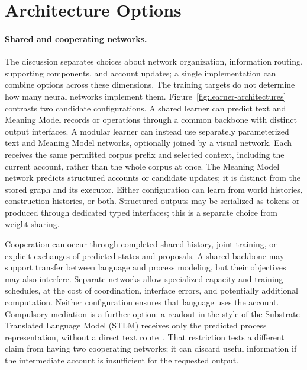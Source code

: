 \documentclass[10pt]{article}
\begin{document}
\section{Architecture Options}
\label{app:architecture-options}

\paragraph{Shared and cooperating networks.}
The discussion separates choices about network organization, information
routing, supporting components, and account updates; a single implementation
can combine options across these dimensions.
The training targets do not determine how many neural networks implement them.
Figure~\ref{fig:learner-architectures} contrasts two candidate configurations.
A shared learner can predict text and Meaning Model records or operations
through a common backbone with distinct output interfaces. A modular learner
can instead use separately parameterized text and Meaning Model networks,
optionally joined by a visual network. Each receives the same permitted corpus
prefix and selected context, including the current account, rather than the
whole corpus at once. The Meaning Model network predicts structured accounts
or candidate updates; it is distinct from the stored graph and its executor.
Either configuration can learn from world histories, construction histories,
or both. Structured outputs may be serialized as tokens or produced through
dedicated typed interfaces; this is a separate choice from weight sharing.

Cooperation can occur through completed shared history, joint training, or
explicit exchanges of predicted states and proposals. A shared backbone may
support transfer between language and process modeling, but their objectives
may also interfere. Separate networks allow specialized capacity and training
schedules, at the cost of coordination, interface errors, and potentially
additional computation. Neither configuration ensures that language uses the
account. Compulsory mediation is a further option: a readout in the style of the
Substrate-Translated Language Model (STLM)
receives only the predicted process representation, without a direct text
route~\cite{westerbergSTLM2026}. That restriction tests a different claim from
having two cooperating networks; it can discard useful information if the
intermediate account is insufficient for the requested output.
\end{document}

